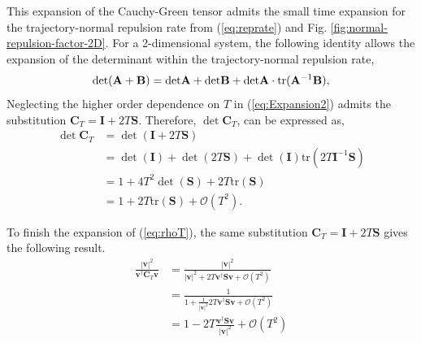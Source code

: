 \documentclass[twocolumn]{svjour3}
\begin{document}
This expansion of the Cauchy-Green tensor admits the small time expansion for the trajectory-normal repulsion rate from (\ref{eq:reprate}) and Fig. \ref{fig:normal-repulsion-factor-2D}. For a 2-dimensional system, the following identity allows the expansion of the determinant within the trajectory-normal repulsion rate,
\begin{equation}
{\rm det} (\mathbf{A} + \mathbf{B}) = {\rm det} \mathbf{A} + {\rm det} \mathbf{B} + {\rm det} \mathbf{A} \cdot {\rm tr}(\mathbf{A}^{-1} \mathbf{B}), 
\end{equation}
Neglecting the higher order dependence on $T$ in (\ref{eq:Expansion2}) admits the substitution \(\mathbf{C}_T   = \mathbf{I} +2T\mathbf{S} \). Therefore, \(\det \mathbf{C}_T \), can be expressed as,
\begin{equation}\label{eq:detC}
\begin{aligned}
\det \mathbf{C}_T &= \det(\mathbf{I} +2T\mathbf{S}) \\
&= \det(\mathbf{I} ) + \det(2T\mathbf{S}) + \det(\mathbf{I}) \text{tr} (2T\mathbf{I} ^{-1}\mathbf{S}) \\
&= 1 + 4T^2\det(\mathbf{S}) + 2T\text{tr}(\mathbf{S}) \\
&= 1 + 2T\text{tr}(\mathbf{S}) + \mathcal{O}(T^2).
\end{aligned}
\end{equation}

To finish the expansion of  (\ref{eq:rhoT}), the same substitution \(\mathbf{C}_T   = \mathbf{I} +2T\mathbf{S} \) gives the following result.
\begin{equation}\label{eq:expand}
\begin{aligned}
\frac{\left|\mathbf{v}\right|^2}{\mathbf{v}^\dagger \mathbf{C}_T\mathbf{v}} &= \frac{\left|\mathbf{v}\right|^2}{\left|\mathbf{v}\right|^2+2T \mathbf{v}^\dagger\mathbf{S}\mathbf{v}+\mathcal{O}(T^2)} \\
&= \frac{1}{1+\frac{1}{\left|\mathbf{v}\right|^2}2T\mathbf{v}^\dagger\mathbf{S}\mathbf{v}+\mathcal{O}(T^2)} \\
&= 1-2T \frac{\mathbf{v}^\dagger \mathbf{S}\mathbf{v}}{\left|\mathbf{v}\right|^2} + \mathcal{O}(T^2)
\end{aligned}
\end{equation}
\end{document}
